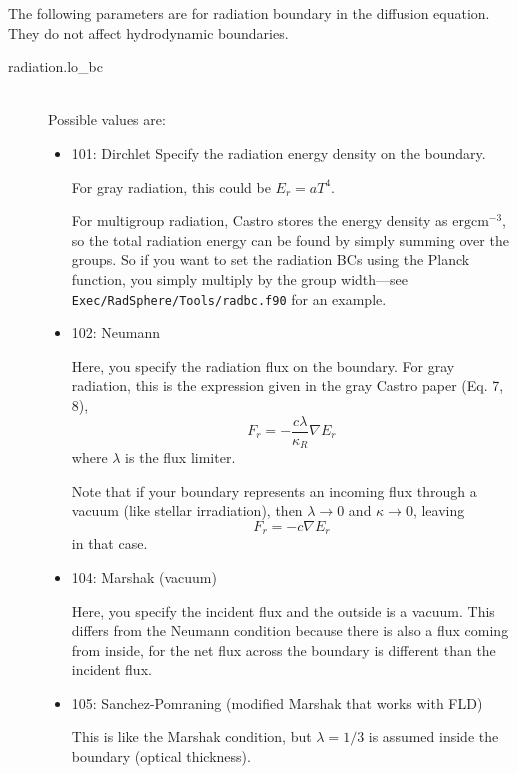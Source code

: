 \documentclass[11pt,letterpaper]{article}
\begin{document}
The following parameters are for radiation boundary in the diffusion
equation. They do not affect hydrodynamic boundaries. 
\begin{description}
\item[radiation.lo\_bc] \hfill \\
  Possible values are:
  \begin{itemize}
  \item 101: Dirchlet
    Specify the radiation energy density on the boundary.

    For gray radiation, this could be $E_r = a T^4$.

    For multigroup radiation, Castro stores the energy density as
    $\mathrm{erg} \mathrm{cm}^{-3}$, so the total radiation energy
    can be found by simply summing over the groups.  So if you want
    to set the radiation BCs using the Planck function, you simply
    multiply by the group width---see {\tt Exec/RadSphere/Tools/radbc.f90}
    for an example.
        
    \item 102: Neumann

      Here, you specify the radiation flux on the boundary.  For gray
      radiation, this is the expression given in the gray Castro paper
      (Eq. 7, 8),
      \begin{equation}
        F_r = - \frac{c\lambda}{\kappa_R} \nabla E_r
      \end{equation}
      where $\lambda$ is the flux limiter.

      Note that if your boundary represents an incoming flux through
      a vacuum (like stellar irradiation), then $\lambda \rightarrow 0$
      and $\kappa \rightarrow 0$, leaving
      \begin{equation}
        F_r = -c\nabla E_r
      \end{equation}
      in that case.
      

    \item 104: Marshak (vacuum)

      Here, you specify the
      incident flux and the outside is a vacuum.  This differs from the
      Neumann condition because there is also a flux coming from inside,
      for the net flux across the boundary is different than the incident
      flux.
      
    \item 105: Sanchez-Pomraning (modified Marshak that works with FLD)

      This is like the Marshak condition, but $\lambda = 1/3$ is assumed inside
      the boundary (optical thickness).
      

\end{itemize}
\end{description}
\end{document}
